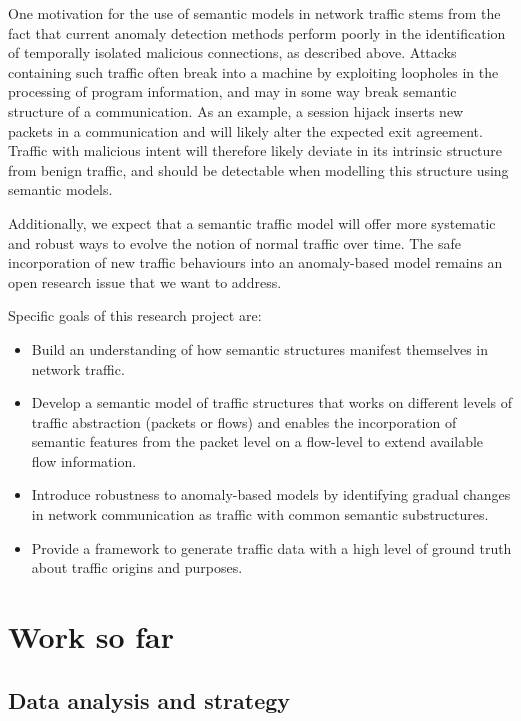 \documentclass[a4paper,12pt,twoside]{report}
\begin{document}
One motivation for the use of semantic models in network traffic stems from the fact that current anomaly detection methods perform poorly in the identification of temporally isolated malicious connections, as described above. Attacks containing such traffic often break into a machine by exploiting loopholes in the processing of program information, and may in some way  break semantic structure of a communication. As an example, a session hijack inserts new packets in a communication and will likely alter the expected exit agreement. Traffic with malicious intent will therefore likely deviate in its intrinsic structure from benign traffic, and should be detectable when modelling this structure using semantic models.

Additionally, we expect that a semantic traffic model will offer more systematic and robust ways to evolve the notion of normal traffic over time. The safe incorporation of new traffic behaviours into an anomaly-based model remains an open research issue that we want to address.

Specific goals of this research project are:
\begin{itemize}
\item Build an understanding of how semantic structures manifest themselves in network traffic.
\item Develop a semantic model of traffic structures that works on different levels of traffic abstraction (packets or flows) and enables the incorporation of semantic features from the packet level on a flow-level to extend available flow information.
\item Introduce robustness to anomaly-based models by identifying gradual changes in network communication as traffic with common semantic substructures.
\item Provide a framework to generate traffic data with a high level of ground truth about traffic origins and purposes.
\end{itemize}



\chapter{Work so far}\label{Sofar}



\section{Data analysis and strategy}
\end{document}
